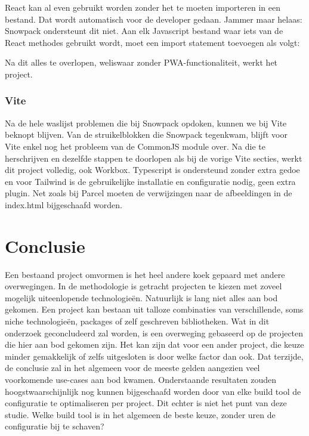 React kan al even gebruikt worden zonder het te moeten importeren in een bestand. Dat wordt automatisch voor de developer gedaan. Jammer maar helaas: Snowpack ondersteunt dit niet. Aan elk Javascript bestand waar iets van de React methodes gebruikt wordt, moet een import statement toevoegen als volgt:

   

Na dit alles te overlopen, weliswaar zonder PWA-functionaliteit, werkt het project.

\subsubsection{Vite}
Na de hele waslijst problemen die bij Snowpack opdoken, kunnen we bij Vite beknopt blijven. Van de struikelblokken die Snowpack tegenkwam, blijft voor Vite enkel nog het probleem van de CommonJS module over. Na die te herschrijven en dezelfde stappen te doorlopen als bij de vorige Vite secties, werkt dit project volledig, ook Workbox. Typescript is ondersteund zonder extra gedoe en voor Tailwind is de gebruikelijke installatie en configuratie nodig, geen extra plugin. Net zoals bij Parcel moeten de verwijzingen naar de afbeeldingen in de index.html bijgeschaafd worden.

\section{Conclusie}
Een bestaand project omvormen is het heel andere koek gepaard met andere overwegingen. In de methodologie is getracht projecten te kiezen met zoveel mogelijk uiteenlopende technologieën. Natuurlijk is lang niet alles aan bod gekomen. Een project kan bestaan uit talloze combinaties van verschillende, soms niche technologieën, packages of zelf geschreven bibliotheken. Wat in dit onderzoek geconcludeerd zal worden, is een overweging gebaseerd op de projecten die hier aan bod gekomen zijn. Het kan zijn dat voor een ander project, die keuze minder gemakkelijk of zelfs uitgesloten is door welke factor dan ook. Dat terzijde, de conclusie zal in het algemeen voor de meeste gelden aangezien veel voorkomende use-cases aan bod kwamen. Onderstaande resultaten zouden hoogstwaarschijnlijk nog kunnen bijgeschaafd worden door van elke build tool de configuratie te optimaliseren per project. Dit echter is niet het punt van deze studie. Welke build tool is in het algemeen de beste keuze, zonder uren de configuratie bij te schaven?

